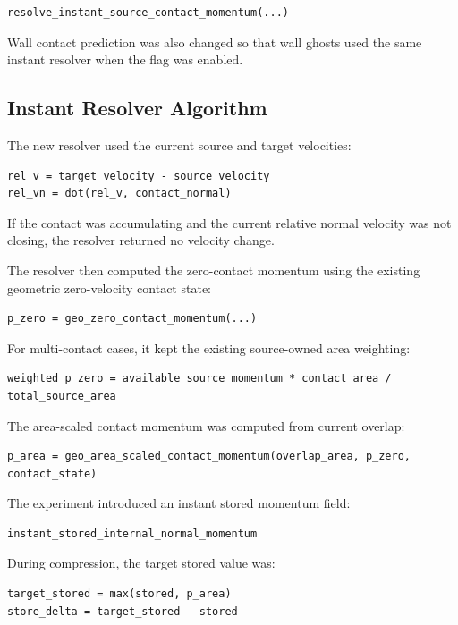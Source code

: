 \begin{verbatim}
resolve_instant_source_contact_momentum(...)
\end{verbatim}

Wall contact prediction was also changed so that wall ghosts used the same
instant resolver when the flag was enabled.

\subsection{Instant Resolver Algorithm}

The new resolver used the current source and target velocities:

\begin{verbatim}
rel_v = target_velocity - source_velocity
rel_vn = dot(rel_v, contact_normal)
\end{verbatim}

If the contact was accumulating and the current relative normal velocity was not
closing, the resolver returned no velocity change.

The resolver then computed the zero-contact momentum using the existing
geometric zero-velocity contact state:

\begin{verbatim}
p_zero = geo_zero_contact_momentum(...)
\end{verbatim}

For multi-contact cases, it kept the existing source-owned area weighting:

\begin{verbatim}
weighted p_zero = available source momentum * contact_area / total_source_area
\end{verbatim}

The area-scaled contact momentum was computed from current overlap:

\begin{verbatim}
p_area = geo_area_scaled_contact_momentum(overlap_area, p_zero, contact_state)
\end{verbatim}

The experiment introduced an instant stored momentum field:

\begin{verbatim}
instant_stored_internal_normal_momentum
\end{verbatim}

During compression, the target stored value was:

\begin{verbatim}
target_stored = max(stored, p_area)
store_delta = target_stored - stored
\end{verbatim}

